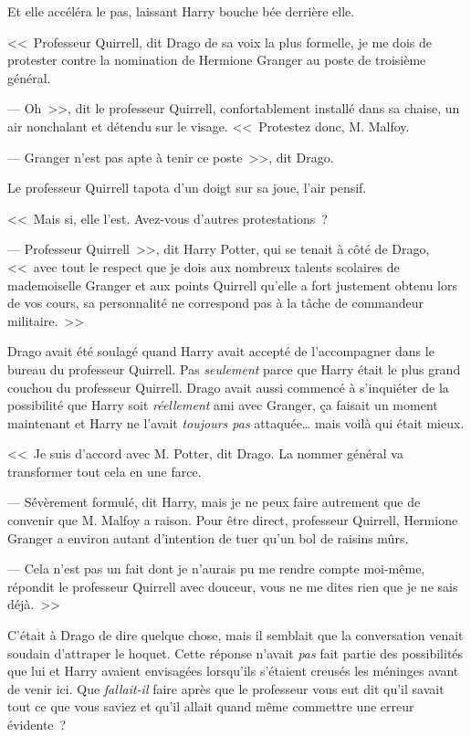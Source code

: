 Et elle accéléra le pas, laissant Harry bouche bée derrière elle.

\later

<<~Professeur Quirrell, dit Drago de sa voix la plus formelle, je me dois de protester contre la nomination de Hermione Granger au poste de troisième général.

--- Oh~>>, dit le professeur Quirrell, confortablement installé dans sa chaise, un air nonchalant et détendu sur le visage. <<~Protestez donc, M. Malfoy.

--- Granger n'est pas apte à tenir ce poste~>>, dit Drago.

Le professeur Quirrell tapota d'un doigt sur sa joue, l'air pensif.

<<~Mais si, elle l'est. Avez-vous d'autres protestations~?

--- Professeur Quirrell~>>, dit Harry Potter, qui se tenait à côté de Drago, <<~avec tout le respect que je dois aux nombreux talents scolaires de mademoiselle Granger et aux points Quirrell qu'elle a fort justement obtenu lors de vos cours, sa personnalité ne correspond pas à la tâche de commandeur militaire.~>>

Drago avait été soulagé quand Harry avait accepté de l'accompagner dans le bureau du professeur Quirrell. Pas \emph{seulement} parce que Harry était le plus grand couchou du professeur Quirrell. Drago avait aussi commencé à s'inquiéter de la possibilité que Harry soit \emph{réellement} ami avec Granger, ça faisait un moment maintenant et Harry ne l'avait \emph{toujours pas} attaquée… mais voilà qui était mieux.

<<~Je suis d'accord avec M. Potter, dit Drago. La nommer général va transformer tout cela en une farce.

--- Sévèrement formulé, dit Harry, mais je ne peux faire autrement que de convenir que M. Malfoy a raison. Pour être direct, professeur Quirrell, Hermione Granger a environ autant d'intention de tuer qu'un bol de raisins mûrs.

--- Cela n'est pas un fait dont je n'aurais pu me rendre compte moi-même, répondit le professeur Quirrell avec douceur, vous ne me dites rien que je ne sais déjà.~>>

C'était à Drago de dire quelque chose, mais il semblait que la conversation venait soudain d'attraper le hoquet. Cette réponse n'avait \emph{pas} fait partie des possibilités que lui et Harry avaient envisagées lorsqu'ils s'étaient creusés les méninges avant de venir ici. Que \emph{fallait-il} faire après que le professeur vous eut dit qu'il savait tout ce que vous saviez et qu'il allait quand même commettre une erreur évidente~?

